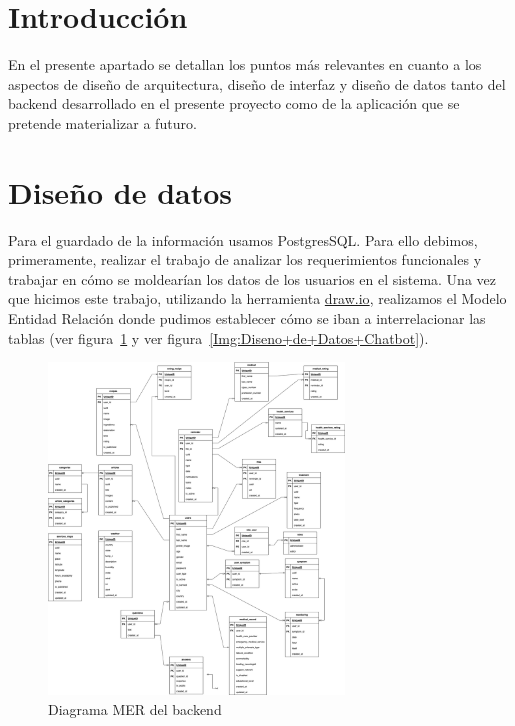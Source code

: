 
\section{Introducción}
En el presente apartado se detallan los puntos más relevantes en cuanto a los aspectos de diseño de arquitectura, diseño de interfaz y diseño de datos tanto del backend desarrollado en el presente proyecto como de la aplicación que se pretende materializar a futuro.

\section{Diseño de datos}
Para el guardado de la información usamos PostgresSQL. Para ello debimos, primeramente, realizar el trabajo de analizar los requerimientos funcionales y trabajar en cómo se moldearían los datos de los usuarios en el sistema.
Una vez que hicimos este trabajo, utilizando la herramienta \href{https://drive.google.com/file/d/1h34iN2JwS4Tcr9MRbupvjsVVfN3LC1cf/view?usp=sharing}{draw.io}, realizamos el Modelo Entidad Relación donde pudimos establecer cómo se iban a interrelacionar las tablas (ver figura~\ref{Img:Diseno+de+Datos+Backend} y ver figura~\ref{Img:Diseno+de+Datos+Chatbot}).
\begin{figure}[h]
    \centering
    \includegraphics[width=0.7\textwidth]{img/datos/diagrama_db_backend.png}
    \caption{Diagrama MER del backend} \label{Img:Diseno+de+Datos+Backend}
\end{figure} 

